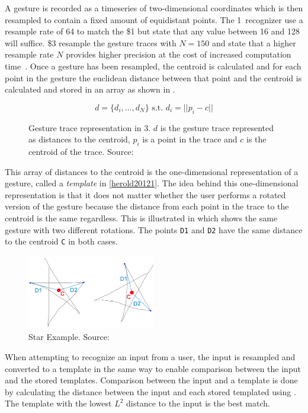 A gesture is recorded as a timeseries of two-dimensional coordinates which is then resampled to contain a fixed amount of equidistant points.
The 1\textcent~recognizer use a resample rate of 64 to match the \$1 but state that any value between 16 and 128 will suffice.
\$3 resample the gesture traces with $N = 150$ and state that a higher resample rate $N$ provides higher precision at the cost of increased computation time~\cite[p. 342]{threedollar}.
Once a gesture has been resampled, the centroid is calculated and for each point in the gesture the euclidean distance between that point and the centroid is calculated and stored in an array as shown in .

\begin{figure}[h]
\[ d = \{d_i,\ldots,d_N\} \text{ s.t. } d_i=||p_i-c|| \]
\caption{Gesture trace representation in 3\textcent. $d$ is the gesture trace represented as distances to the centroid, $p_i$ is a point in the trace and $c$ is the centroid of the trace. Source:~\cite{herold20121}}
\label{eq:one-cent-trace}
\end{figure}

This array of distances to the centroid is the one-dimensional representation of a gesture, called a \emph{template} in \cref{herold20121}.
The idea behind this one-dimensional representation is that it does not matter whether the user performs a rotated version of the gesture because the distance from each point in the trace to the centroid is the same regardless.
This is illustrated in  which shows the same gesture with two different rotations.
The points \texttt{D1} and \texttt{D2} have the same distance to the centroid \texttt{C} in both cases.

\begin{figure}[h]
\centering
\includegraphics[width=0.5\textwidth]{images/one-cent-star-example}
\caption{Star Example. Source:~\cite{herold20121}}
\label{fig:one-cent-star}
\end{figure}

When attempting to recognize an input from a user, the input is resampled and converted to a template in the same way to enable comparison between the input and the stored templates.
Comparison between the input and a template is done by calculating the distance between the input and each stored templated using .
The template with the lowest $L^2$ distance to the input is the best match.

